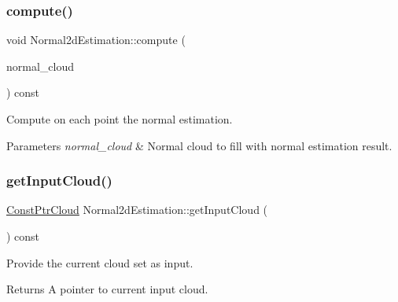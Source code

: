 \subsubsection{\texorpdfstring{compute()}{compute()}\hspace{0.1cm}{\footnotesize\ttfamily [2/2]}}
{\footnotesize\ttfamily void Normal2d\+Estimation\+::compute (\begin{DoxyParamCaption}\item[{const pcl\+::\+Point\+Cloud$<$ pcl\+::\+Normal $>$\+::Ptr \&}]{normal\+\_\+cloud }\end{DoxyParamCaption}) const}



Compute on each point the normal estimation. 


\begin{DoxyParams}{Parameters}
{\em normal\+\_\+cloud} & Normal cloud to fill with normal estimation result. \\
\hline
\end{DoxyParams}
\mbox{\label{classNormal2dEstimation_a386f045fac5df50ed493d7b0aa265482}} 
\subsubsection{\texorpdfstring{get\+Input\+Cloud()}{getInputCloud()}}
{\footnotesize\ttfamily \hyperlink{Normal2dEstimation_8h_a389a43addc496dc19a5bb0575cc60bc4}{Const\+Ptr\+Cloud} Normal2d\+Estimation\+::get\+Input\+Cloud (\begin{DoxyParamCaption}{ }\end{DoxyParamCaption}) const\hspace{0.3cm}{\ttfamily [inline]}}



Provide the current cloud set as input. 

\begin{DoxyReturn}{Returns}
A pointer to current input cloud. 
\end{DoxyReturn}
\mbox{\label{classNormal2dEstimation_a19ddcf3ade201742d36e64869c344641}} 
